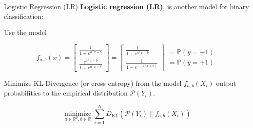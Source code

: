 \begin{frame}[allowframebreaks]

\begin{mydefinitionblock}{3.12}{Logistic Regression (LR)}
    \textbf{Logistic regression (LR)}, is another model for binary classification:

    Use the model

    $$
    f_{a, b}(x)=\left[\begin{array}{c}
    \frac{1}{1+e^{a^{\top} x+b}} \\
    \frac{e^{a^{\top} x+b}}{1+e^{a^{\top} x+b}}
    \end{array}\right]=\left[\begin{array}{c}
    \frac{1}{1+e^{a^{\top} x+b}} \\
    \frac{1}{1+e^{-\left(a^{\top} x+b\right)}}
    \end{array}\right]\begin{array}{c}
    = \mathbb{P}(y=-1) \\
    = \mathbb{P}(y=+1)
    \end{array}
    $$

    Minimize KL-Divergence (or cross entropy) from the model $f_{a, b}\left(X_{i}\right)$ output probabilities to the empirical distribution $\mathcal{P}\left(Y_{i}\right)$.

    $$
    \underset{a \in \mathbb{R}^{p}, b \in \mathbb{R}}{\operatorname{minimize}} \sum_{i=1}^{N} D_{\mathrm{KL}}\left(\mathcal{P}\left(Y_{i}\right) \| f_{a, b}\left(X_{i}\right)\right)
    $$
\end{mydefinitionblock}

\end{frame}

